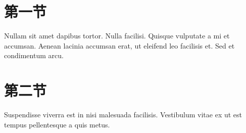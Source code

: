 \documentclass[float=false, crop=false]{standalone}
\begin{document}
    \section{第一节}
    Nullam sit amet dapibus tortor.
        Nulla facilisi. Quisque vulputate a mi et accumsan.
        Aenean lacinia accumsan erat, ut eleifend leo facilisis et.
        Sed et condimentum arcu.
    \section{第二节}
    Suspendisse viverra est in nisi malesuada facilisis.
        Vestibulum vitae ex ut est tempus pellentesque a quis metus.
\end{document}
